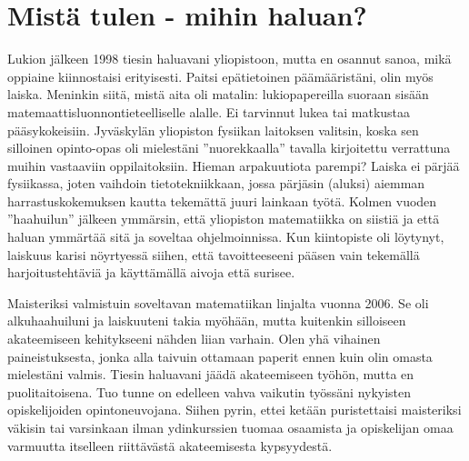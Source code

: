 \documentclass[utf8]{gradu3}
\begin{document}
\chapter{Mistä tulen - mihin haluan?}
\label{taustatJaTavoitteet}



%

Lukion jälkeen 1998 tiesin haluavani yliopistoon, mutta en osannut sanoa, mikä
oppiaine kiinnostaisi erityisesti. Paitsi epätietoinen päämääristäni, olin myös
laiska. Meninkin siitä, mistä aita oli matalin: lukiopapereilla suoraan sisään
matemaattisluonnontieteelliselle alalle. Ei tarvinnut lukea tai matkustaa
pääsykokeisiin. Jyväskylän yliopiston fysiikan laitoksen valitsin, koska sen
silloinen opinto-opas oli mielestäni ”nuorekkaalla” tavalla kirjoitettu
verrattuna muihin vastaaviin oppilaitoksiin. Hieman arpakuutiota parempi? Laiska
ei pärjää fysiikassa, joten vaihdoin tietotekniikkaan, jossa pärjäsin (aluksi)
aiemman harrastuskokemuksen kautta tekemättä juuri lainkaan työtä. Kolmen vuoden
”haahuilun” jälkeen ymmärsin, että yliopiston matematiikka on siistiä ja että
haluan ymmärtää sitä ja soveltaa ohjelmoinnissa. Kun kiintopiste oli löytynyt,
laiskuus karisi nöyrtyessä siihen, että tavoitteeseeni pääsen vain tekemällä
harjoitustehtäviä ja käyttämällä aivoja että surisee.

Maisteriksi valmistuin soveltavan matematiikan linjalta vuonna 2006. Se oli
alkuhaahuiluni ja laiskuuteni takia myöhään, mutta kuitenkin silloiseen
akateemiseen kehitykseeni nähden liian varhain. Olen yhä vihainen
paineistuksesta, jonka alla taivuin ottamaan paperit ennen kuin olin omasta
mielestäni valmis. Tiesin haluavani jäädä akateemiseen työhön, mutta en
puolitaitoisena. Tuo tunne on edelleen vahva vaikutin työssäni nykyisten
opiskelijoiden opintoneuvojana. Siihen pyrin, ettei ketään puristettaisi
maisteriksi väkisin tai varsinkaan ilman ydinkurssien tuomaa osaamista ja
opiskelijan omaa varmuutta itselleen riittävästä akateemisesta kypsyydestä.
\end{document}
